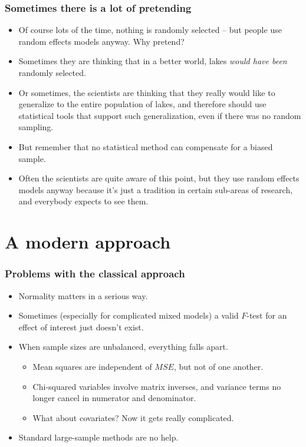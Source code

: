 \documentclass[serif]{beamer} %
\begin{document}
\begin{frame}
\frametitle{Sometimes there is a lot of pretending}
  \begin{itemize}
    \item Of course lots of the time, nothing is randomly selected -- but people use random effects models anyway.  Why pretend?
    \item Sometimes they are thinking that in a better world, lakes \emph{would have been} randomly selected. 
    \item Or sometimes, the scientists are thinking that they really would like to generalize to the entire population of lakes, and therefore should use statistical tools that support such generalization, even if there was no random sampling.
    \item But remember that no statistical method can compensate for a biased sample.
    \item Often the scientists are quite aware of this point, but they use random effects models anyway because it's just a tradition in certain sub-areas of research, and everybody expects to see them.  

  \end{itemize}
\end{frame}



\section{A modern approach}

\begin{frame}
\frametitle{Problems with the classical approach}
  \begin{itemize}
    \item Normality matters in a serious way.
    \item Sometimes (especially for complicated mixed models) a valid $F$-test for an effect of interest just doesn't exist.
    \item When sample sizes are unbalanced, everything falls apart. 
        \begin{itemize}
            \item Mean squares are independent of $MSE$, but not of one another.
            \item Chi-squared variables involve matrix inverses, and variance terms no longer cancel in numerator and denominator.
    \item What about covariates? Now it gets really complicated.
        \end{itemize}
    \item Standard large-sample methods are no help.
  \end{itemize}
\end{frame}
\end{document}
